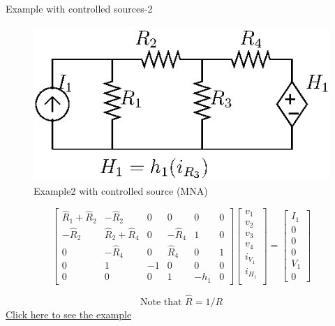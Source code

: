 \documentclass{beamer}
\begin{document}
\begin{frame}
\begin{block}{Example with controlled sources-2}
\begin{figure}[!ht]
\begin{center}
\includegraphics[scale=0.6]{../figures/linearckt2.eps}
\caption{ \scriptsize Example2 with controlled source (MNA)} \label{modifiedfig}
\end{center}
\end{figure}
\begin{tiny}
$$\left[
\begin{array}{cccccc}
\widehat{R}_{1}+\widehat{R}_{2} & -\widehat{R}_{2} & 0 & 0 & 0 &0\\
-\widehat{R}_{2} &\widehat{R}_{2}+\widehat{R}_{4} &0& -\widehat{R}_{4} & 1 & 0  \\
0 & -\widehat{R}_{4} & 0 & \widehat{R}_{4} & 0  & 1  \\
0 & 1& -1 &0 & 0 & 0   \\
0 & 0 & 0 & 1 & -h_1 &0 
\end{array}
\right] \left[
\begin{array}{c}
v_{1}\\
v_{2}\\
v_{3}\\
v_{4}\\
i_{V_1}\\
i_{H_1}\\
\end{array}
\right]= \left[
\begin{array}{c}
I_1\\
0\\
0\\
0\\
V_{1}\\
0
\end{array}
\right]$$
\end{tiny}
\tiny $$\mbox{Note that } \widehat{R}=1/R$$
\tiny \href{run:../../LPCSim_1.0/ckt/linear2.ckt}{\color{red} Click here to see the example}
\end{block}
\end{frame}
\end{document}
